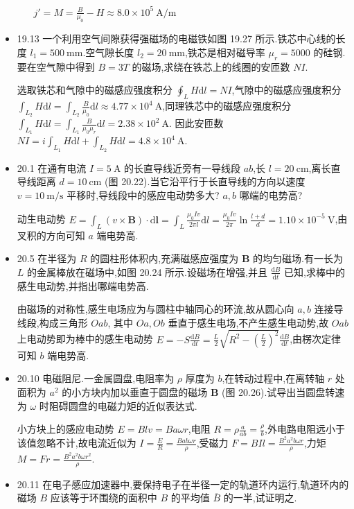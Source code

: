 \begin{itemize}
\begin{enumerate}
                    $j'=M=\frac{B}{\mu_0}-H\approx 8.0\times 10^{5} \ \mathrm{A / m}$
            \end{enumerate}
        \item 19.13 一个利用空气间隙获得强磁场的电磁铁如图 19.27 所示.铁芯中心线的长度 $l_1=500 \ \mathrm{mm}$.空气隙长度 $l_2=20 \ \mathrm{mm}$,铁芯是相对磁导率 $\mu_{r}=5000$ 的硅钢.要在空气隙中得到 $B=3T$ 的磁场,求绕在铁芯上的线圈的安匝数 $NI$.

            选取铁芯和气隙中的磁感应强度积分 $\oint_{L}^{}H\mathrm{d}l=NI$,气隙中的磁感应强度积分 $\int_{L_2}^{}H\mathrm{d}l=\int_{L_2}^{}\frac{B}{\mu_0}\mathrm{d}l\approx 4.77\times 10^{4} \ \mathrm{A}$,同理铁芯中的磁感应强度积分 $\int_{L_1}^{}H\mathrm{d}l=\int_{L_1}^{}\frac{B}{\mu_0\mu_{r}}\mathrm{d}l=2.38\times 10^{2} \ \mathrm{A}$. 因此安匝数 $NI=i\int_{L_1}^{}H\mathrm{d}l+\int_{L_2}^{}H\mathrm{d}l=4.8\times 10^{4} \ \mathrm{A}$.
        \item 20.1 在通有电流 $I=5 \ \mathrm{A}$ 的长直导线近旁有一导线段 $ab$,长 $l=20 \ \mathrm{cm}$,离长直导线距离 $d=10 \ \mathrm{cm}$ (图 20.22).当它沿平行于长直导线的方向以速度 $v=10 \ \mathrm{m / s}$ 平移时,导线段中的感应电动势多大? $a,b$ 哪端的电势高?

            动生电动势 $E=\int_{L}^{}(v\times \bm{B})\cdot \mathrm{d}\bm{l}=\int_{L}^{}\frac{\mu_0Iv}{2\pi l}\mathrm{d}l=\frac{\mu_0Iv}{2\pi}\ln \frac{l+d}{d}=1.10\times 10^{-5} \ \mathrm{V}$,由叉积的方向可知 $a$ 端电势高.
        \item 20.5 在半径为 $R$ 的圆柱形体积内,充满磁感应强度为 $\bm{B}$ 的均匀磁场.有一长为 $L$ 的金属棒放在磁场中,如图 20.24 所示.设磁场在增强,并且 $\frac{\mathrm{d}B}{\mathrm{d}t}$ 已知,求棒中的感生电动势,并指出哪端电势高.

            由磁场的对称性,感生电场应为与圆柱中轴同心的环流,故从圆心向 $a,b$ 连接导线段,构成三角形 $Oab$, 其中 $Oa,Ob$ 垂直于感生电场,不产生感生电动势,故 $Oab$ 上电动势即为棒中的感生电动势 $E=-S \frac{\mathrm{d}B}{\mathrm{d}t}=\frac{L}{2}\sqrt{R^2-\left(\frac{L}{2}\right)^2}\frac{\mathrm{d}B}{\mathrm{d}t}$,由楞次定律可知 $b$ 端电势高.
        \item 20.10 电磁阻尼.一金属圆盘,电阻率为 $\rho$ 厚度为 $b$,在转动过程中,在离转轴 $r$ 处面积为 $a^2$ 的小方块内加以垂直于圆盘的磁场 $\bm{B}$ (图 20.26).试导出当圆盘转速为 $\omega$ 时阻碍圆盘的电磁力矩的近似表达式.

            小方块上的感应电动势 $E=Blv=Ba\omega r$,电阻 $R=\rho\frac{a}{ab}=\frac{\rho}{b}$,外电路电阻远小于该值忽略不计,故电流近似为 $I=\frac{E}{R}=\frac{Bab\omega r}{\rho}$,受磁力 $F=BIl=\frac{B^2a^2b\omega r}{\rho}$,力矩 $M=Fr=\frac{B^2a^2b\omega r^2}{\rho}$.
        \item 20.11 在电子感应加速器中,要保持电子在半径一定的轨道环内运行,轨道环内的磁场 $B$ 应该等于环围绕的面积中 $B$ 的平均值 $\overline{B}$ 的一半,试证明之.


\end{itemize}
